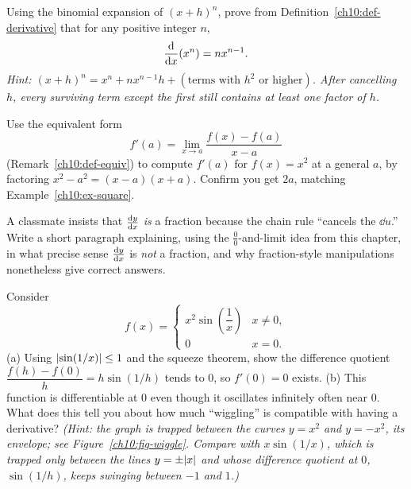 \begin{exercise}
\label{ch10:ex-prove-power}
Using the binomial expansion of $(x+h)^n$, prove from
Definition~\ref{ch10:def-derivative} that for any positive integer $n$,
\[
  \frac{\mathrm{d}}{\mathrm{d} x}\!\left(x^n\right) = n x^{n-1}.
\]
\emph{Hint: $(x+h)^n = x^n + nx^{n-1}h + (\text{terms with } h^2 \text{ or
higher})$. After cancelling $h$, every surviving term except the first still
contains at least one factor of $h$.}
\end{exercise}

\begin{exercise}
\label{ch10:ex-other-def}
Use the equivalent form
\[
  f'(a) = \lim_{x\to a}\frac{f(x)-f(a)}{x-a}
\]
(Remark~\ref{ch10:def-equiv}) to compute $f'(a)$ for $f(x) = x^2$ at a general
$a$, by factoring $x^2 - a^2 = (x-a)(x+a)$. Confirm you get $2a$, matching
Example~\ref{ch10:ex-square}.
\end{exercise}

\begin{exercise}
\label{ch10:ex-fraction}
A classmate insists that $\frac{\mathrm{d} y}{\mathrm{d} x}$ \emph{is} a fraction because the chain rule
``cancels the $\dd u$.'' Write a short paragraph explaining, using the
$\frac00$-and-limit idea from this chapter, in what precise sense $\frac{\mathrm{d} y}{\mathrm{d} x}$ is
\emph{not} a fraction, and why fraction-style manipulations nonetheless give
correct answers.
\end{exercise}

\begin{exercise}
\label{ch10:ex-subtle}
Consider
\[
  f(x) = \begin{cases} x^2 \sin\!\left(\dfrac{1}{x}\right) & x \neq 0,\\[4pt]
  0 & x = 0.\end{cases}
\]
(a) Using $\lvert\sin(1/x)\rvert \le 1$ and the squeeze theorem, show the difference
quotient $\dfrac{f(h)-f(0)}{h} = h\sin(1/h)$ tends to $0$, so $f'(0) = 0$ exists.
(b) This function is differentiable at $0$ even though it oscillates infinitely
often near $0$. What does this tell you about how much ``wiggling'' is compatible
with having a derivative? \emph{(Hint: the graph is trapped between the curves
$y = x^2$ and $y = -x^2$, its \emph{envelope}; see
Figure~\ref{ch10:fig-wiggle}. Compare with $x\sin(1/x)$, which is trapped only
between the lines $y = \pm\lvert x\rvert$ and whose difference quotient at $0$,
$\sin(1/h)$, keeps swinging between $-1$ and $1$.)}
\end{exercise}

